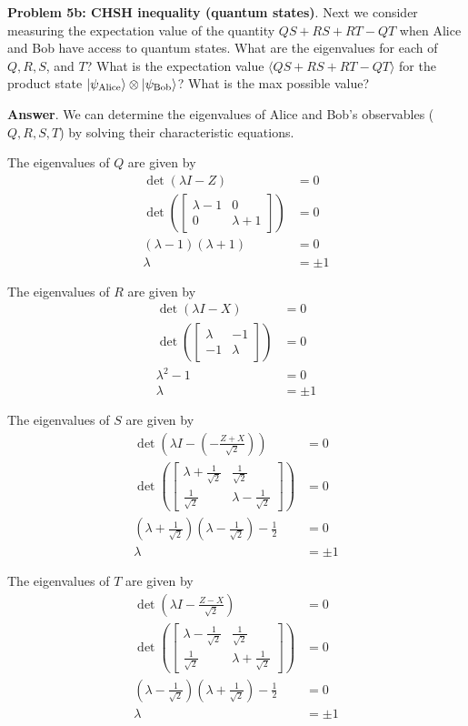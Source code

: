 \textbf{Problem 5b: CHSH inequality (quantum states)}. Next we consider measuring the expectation value of the quantity $QS + RS + RT - QT$ when Alice and Bob have access to quantum states. 
What are the eigenvalues for each of $Q, R, S$, and $T$? 
What is the expectation value $\langle QS + RS + RT - QT \rangle$ for the product state $\ket{\psi_{\text{Alice}}} \otimes \ket{\psi_{\text{Bob}}}$? 
What is the max possible value?


\textbf{Answer}. We can determine the eigenvalues of Alice and Bob's observables ($Q, R, S, T$) by solving their characteristic equations.

The eigenvalues of $Q$ are given by
\begin{align*}
	\det(\lambda I - Z) &= 0 \\
	\det(\begin{bmatrix}
		\lambda - 1 & 0 \\
		0 & \lambda + 1
	\end{bmatrix}) &= 0\\
	(\lambda - 1)(\lambda + 1) &= 0 \\
	\lambda &= \pm 1
\end{align*}

The eigenvalues of $R$ are given by
\begin{align*}
	\det(\lambda I - X) &= 0 \\
	\det(\begin{bmatrix}
		\lambda & -1 \\
		-1 & \lambda
	\end{bmatrix}) &= 0\\
	\lambda^2 - 1 &= 0 \\
	\lambda &= \pm 1
\end{align*}

The eigenvalues of $S$ are given by
\begin{align*}
	\det(\lambda I - \left(-\frac{Z+X}{\sqrt{2}}\right)) &= 0 \\
	\det(\begin{bmatrix}
		\lambda + \frac{1}{\sqrt{2}} & \frac{1}{\sqrt{2}} \\
		\frac{1}{\sqrt{2}} & \lambda - \frac{1}{\sqrt{2}}
	\end{bmatrix}) &= 0\\
	(\lambda + \frac{1}{\sqrt{2}})(\lambda - \frac{1}{\sqrt{2}}) - \frac{1}{2} &= 0 \\
	\lambda &= \pm 1
\end{align*}

The eigenvalues of $T$ are given by
\begin{align*}
	\det(\lambda I - \frac{Z-X}{\sqrt{2}}) &= 0 \\
	\det(\begin{bmatrix}
		\lambda - \frac{1}{\sqrt{2}} & \frac{1}{\sqrt{2}} \\
		\frac{1}{\sqrt{2}} & \lambda + \frac{1}{\sqrt{2}}
	\end{bmatrix}) &= 0\\
	(\lambda - \frac{1}{\sqrt{2}})(\lambda + \frac{1}{\sqrt{2}}) - \frac{1}{2} &= 0 \\
	\lambda &= \pm 1
\end{align*}

